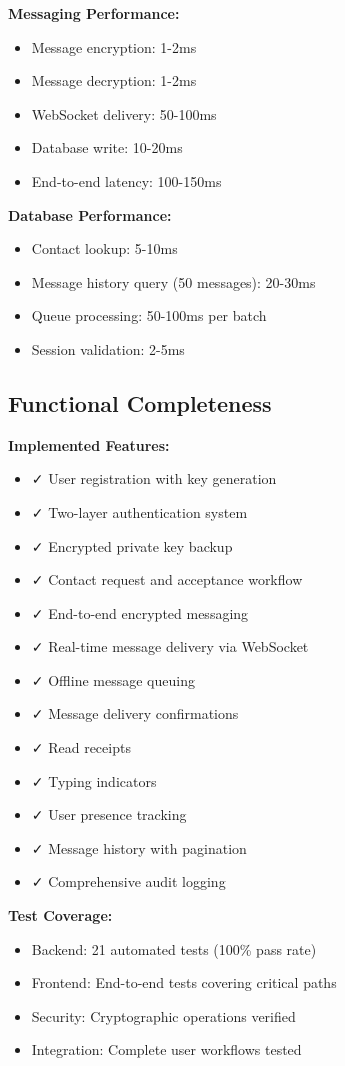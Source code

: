 \textbf{Messaging Performance:}
\begin{itemize}
    \item Message encryption: 1-2ms
    \item Message decryption: 1-2ms
    \item WebSocket delivery: 50-100ms
    \item Database write: 10-20ms
    \item End-to-end latency: 100-150ms
\end{itemize}

\textbf{Database Performance:}
\begin{itemize}
    \item Contact lookup: 5-10ms
    \item Message history query (50 messages): 20-30ms
    \item Queue processing: 50-100ms per batch
    \item Session validation: 2-5ms
\end{itemize}

\subsection{Functional Completeness}

\textbf{Implemented Features:}
\begin{itemize}
    \item ✓ User registration with key generation
    \item ✓ Two-layer authentication system
    \item ✓ Encrypted private key backup
    \item ✓ Contact request and acceptance workflow
    \item ✓ End-to-end encrypted messaging
    \item ✓ Real-time message delivery via WebSocket
    \item ✓ Offline message queuing
    \item ✓ Message delivery confirmations
    \item ✓ Read receipts
    \item ✓ Typing indicators
    \item ✓ User presence tracking
    \item ✓ Message history with pagination
    \item ✓ Comprehensive audit logging
\end{itemize}

\textbf{Test Coverage:}
\begin{itemize}
    \item Backend: 21 automated tests (100\% pass rate)
    \item Frontend: End-to-end tests covering critical paths
    \item Security: Cryptographic operations verified
    \item Integration: Complete user workflows tested
\end{itemize}

